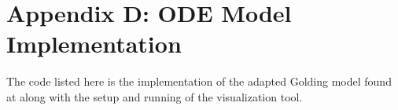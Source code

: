 \chapter{Appendix D: ODE Model Implementation}
\label{AppendixD}

The code listed here is the implementation of the adapted Golding model found at  along with the setup and running of the visualization tool. 

